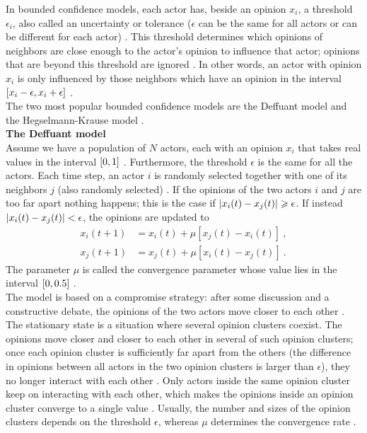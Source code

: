 \documentclass[11 pt , letterpaper , twoside , openright]{book}
\begin{document}
In bounded confidence models, each actor has, beside an opinion $x_i$, a threshold $\epsilon_i$, also called an uncertainty or tolerance ($\epsilon$ can be the same for all actors or can be different for each actor) \cite{Castellano2009}\cite{Deffuant2006}. This threshold determines which opinions of neighbors are close enough to the actor's opinion to influence that actor; opinions that are beyond this threshold are ignored \cite{Deffuant2006}. In other words, an actor with opinion $x_i$ is only influenced by those neighbors which have an opinion in the interval $\interval{x_i-\epsilon}{x_i+\epsilon}$ \cite{Castellano2009}. \\
\newline
The two most popular bounded confidence models are the Deffuant model and the Hegselmann-Krause model \cite{Castellano2009}. \\
\newline
\textbf{The Deffuant model}\\
\newline
Assume we have a population of $N$ actors, each with an opinion $x_i$ that takes real values in the interval $\interval{0}{1}$ \cite{Castellano2009}. Furthermore, the threshold $\epsilon$ is the same for all the actors. Each time step, an actor $i$ is randomly selected together with one of its neighbors $j$ (also randomly selected) \cite{Castellano2009}. If the opinions of the two actors $i$ and $j$ are too far apart nothing happens; this is the case if $\abs{x_i(t) - x_j(t)} \geqslant \epsilon$. If instead $\abs{x_i(t) - x_j(t)} < \epsilon$, the opinions are updated to \cite{Castellano2009}\cite{Deffuant2000}
\begin{equation}
\begin{split}
	x_i(t+1) &= x_i(t) + \mu [x_j(t) - x_i(t)] \ ,\\
	x_j(t+1) &= x_j(t) + \mu [x_i(t) - x_j(t)] \ .
\end{split}
\end{equation}
The parameter $\mu$ is called the convergence parameter whose value lies in the interval $\interval{0}{0.5}$ \cite{Castellano2009}. \\
\newline
The model is based on a compromise strategy: after some discussion and a constructive debate, the opinions of the two actors move closer to each other \cite{Castellano2009}. The stationary state is a situation where several opinion clusters coexist. The opinions move closer and closer to each other in several of such opinion clusters; once each opinion cluster is sufficiently far apart from the others (the difference in opinions between all actors in the two opinion clusters is larger than $\epsilon$), they no longer interact with each other \cite{Castellano2009}. Only actors inside the same opinion cluster keep on interacting with each other, which makes the opinions inside an opinion cluster converge to a single value \cite{Castellano2009}. Usually, the number and sizes of the opinion clusters depends on the threshold $\epsilon$, whereas $\mu$ determines the convergence rate \cite{Castellano2009}.\\
\end{document}
